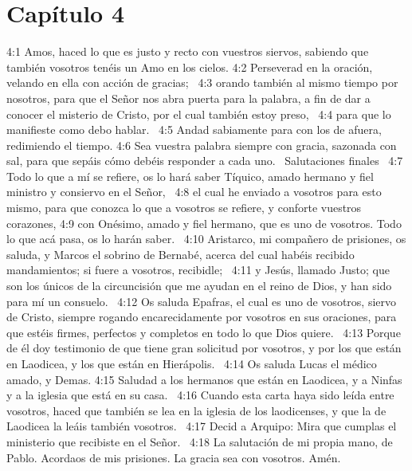 \section*{Capítulo 4 }

4:1 Amos, haced lo que es justo y recto con vuestros siervos, sabiendo que también vosotros tenéis un Amo en los cielos. 
4:2 Perseverad en la oración, velando en ella con acción de gracias;  
4:3 orando también al mismo tiempo por nosotros, para que el Señor nos abra puerta para la palabra, a fin de dar a conocer el misterio de Cristo, por el cual también estoy preso,  
4:4 para que lo manifieste como debo hablar.  
4:5 Andad sabiamente para con los de afuera, redimiendo el tiempo. 
4:6 Sea vuestra palabra siempre con gracia, sazonada con sal, para que sepáis cómo debéis responder a cada uno.  
Salutaciones finales  
4:7 Todo lo que a mí se refiere, os lo hará saber Tíquico, amado hermano y fiel ministro y consiervo en el Señor,  
4:8 el cual he enviado a vosotros para esto mismo, para que conozca lo que a vosotros se refiere, y conforte vuestros corazones, 
4:9 con Onésimo, amado y fiel hermano, que es uno de vosotros. Todo lo que acá pasa, os lo harán saber.  
4:10 Aristarco, mi compañero de prisiones, os saluda, y Marcos el sobrino de Bernabé, acerca del cual habéis recibido mandamientos; si fuere a vosotros, recibidle;  
4:11 y Jesús, llamado Justo; que son los únicos de la circuncisión que me ayudan en el reino de Dios, y han sido para mí un consuelo.  
4:12 Os saluda Epafras, el cual es uno de vosotros, siervo de Cristo, siempre rogando encarecidamente por vosotros en sus oraciones, para que estéis firmes, perfectos y completos en todo lo que Dios quiere.  
4:13 Porque de él doy testimonio de que tiene gran solicitud por vosotros, y por los que están en Laodicea, y los que están en Hierápolis.  
4:14 Os saluda Lucas el médico amado, y Demas. 
4:15 Saludad a los hermanos que están en Laodicea, y a Ninfas y a la iglesia que está en su casa.  
4:16 Cuando esta carta haya sido leída entre vosotros, haced que también se lea en la iglesia de los laodicenses, y que la de Laodicea la leáis también vosotros.  
4:17 Decid a Arquipo: Mira que cumplas el ministerio que recibiste en el Señor.  
4:18 La salutación de mi propia mano, de Pablo. Acordaos de mis prisiones. La gracia sea con vosotros. Amén.  
